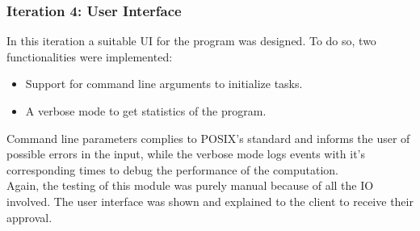       

      \subsubsection{Iteration 4: User Interface}

      In this iteration a suitable UI for the program was designed. To do so,
      two functionalities were implemented:
      \begin{itemize}
        \item Support for command line arguments to initialize tasks.
        \item A verbose mode to get statistics of the program.
      \end{itemize}

      Command line parameters complies to POSIX's standard and informs the
      user of possible errors in the input, while the verbose mode logs events
      with it's corresponding times to debug the performance of the
      computation.\\

      Again, the testing of this module was purely manual because of all
      the IO involved. The user interface was shown and explained to the client
      to receive their approval.\\
